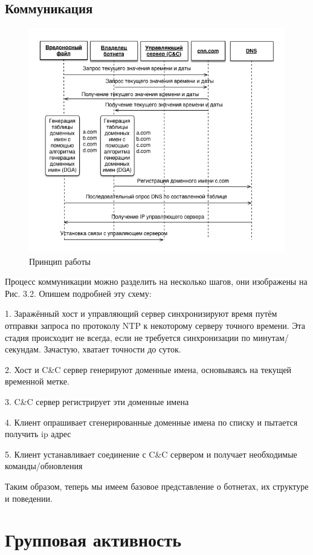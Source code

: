 \documentclass[14pt]{extreport}
\begin{document}
   \section{Коммуникация}
   \begin{figure}[H]
   	\centering
	\includegraphics[scale=0.8]{communicate.png}
	\caption{Принцип работы}
	\end{figure}
	Процесс коммуникации можно разделить на несколько шагов, они изображены на Рис. 3.2. Опишем подробней эту схему:
	
	1. Заражённый хост и управляющий сервер синхронизируют время путём отправки запроса по протоколу NTP к некоторому серверу точного времени. Эта стадия происходит не всегда, если не требуется синхронизации по минутам/секундам. Зачастую, хватает точности до суток.
	
	2. Хост и C\&C сервер генерируют доменные имена, основываясь на текущей временной метке.
	
	3. C\&C сервер регистрирует эти доменные имена
	
	4. Клиент опрашивает сгенерированные доменные имена по списку и пытается получить ip адрес
	
	5. Клиент устанавливает соединение с C\&C сервером и получает необходимые команды/обновления
	
Таким образом, теперь мы имеем базовое представление о ботнетах, их структуре и поведении.

	\chapter{Групповая активность}
\end{document}
